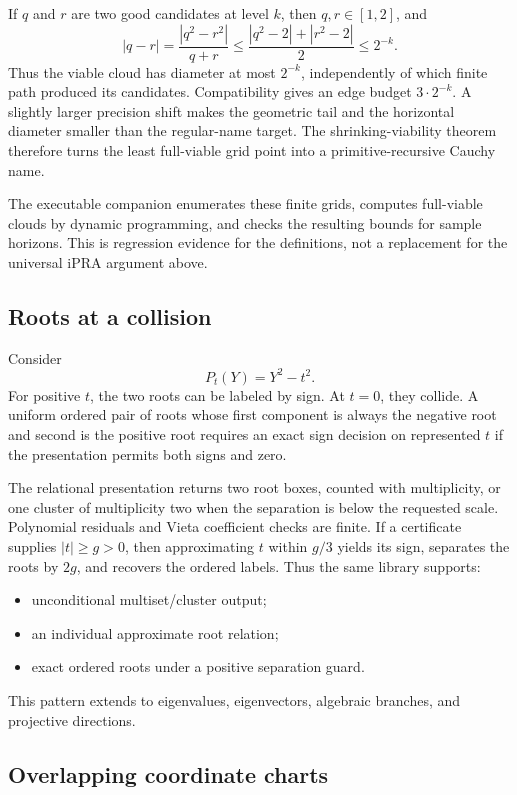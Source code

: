 If \(q\) and \(r\) are two good candidates at level \(k\), then
\(q,r\in[1,2]\), and
\[
 |q-r|=\frac{|q^2-r^2|}{q+r}
 \le \frac{|q^2-2|+|r^2-2|}{2}
 \le 2^{-k}.
\]
Thus the viable cloud has diameter at most \(2^{-k}\), independently of which
finite path produced its candidates.  Compatibility gives an edge budget
\(3\cdot2^{-k}\).  A slightly larger precision shift makes the geometric tail
and the horizontal diameter smaller than the regular-name target.  The
shrinking-viability theorem therefore turns the least full-viable grid point
into a primitive-recursive Cauchy name.

The executable companion enumerates these finite grids, computes full-viable
clouds by dynamic programming, and checks the resulting bounds for sample
horizons.  This is regression evidence for the definitions, not a replacement
for the universal iPRA argument above.

\subsection{Roots at a collision}

Consider
\[
 P_t(Y)=Y^2-t^2.
\]
For positive \(t\), the two roots can be labeled by sign.  At \(t=0\), they
collide.  A uniform ordered pair of roots whose first component is always the
negative root and second is the positive root requires an exact sign decision
on represented \(t\) if the presentation permits both signs and zero.

The relational presentation returns two root boxes, counted with
multiplicity, or one cluster of multiplicity two when the separation is below
the requested scale.  Polynomial residuals and Vieta coefficient checks are
finite.  If a certificate supplies \(|t|\ge g>0\), then approximating \(t\)
within \(g/3\) yields its sign, separates the roots by \(2g\), and recovers the
ordered labels.  Thus the same library supports:

\begin{itemize}
\item unconditional multiset/cluster output;
\item an individual approximate root relation;
\item exact ordered roots under a positive separation guard.
\end{itemize}

This pattern extends to eigenvalues, eigenvectors, algebraic branches, and
projective directions.

\subsection{Overlapping coordinate charts}

